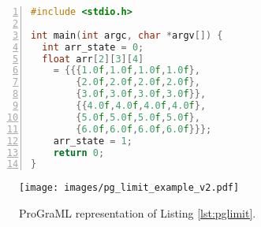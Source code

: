 \begin{minipage}{0.5\textwidth}
\begin{lstlisting}[language=C++,
                   numbers=left,
                   stepnumber=1,
                   numbersep=10pt,
                   showspaces=false,
                   basicstyle=\small,
                   showstringspaces=false,
                   captionpos=b,
                   xleftmargin=.04\textwidth, xrightmargin=.2\textwidth,
                   caption=C++ code example.,
                   label={lst:pglimit},]
#include <stdio.h>

int main(int argc, char *argv[]) {
  int arr_state = 0;
  float arr[2][3][4] 
    = {{{1.0f,1.0f,1.0f,1.0f}, 
        {2.0f,2.0f,2.0f,2.0f}, 
        {3.0f,3.0f,3.0f,3.0f}},
        {{4.0f,4.0f,4.0f,4.0f}, 
        {5.0f,5.0f,5.0f,5.0f}, 
        {6.0f,6.0f,6.0f,6.0f}}};
    arr_state = 1;
    return 0;
}
\end{lstlisting}
\vspace{-1.5cm}
\end{minipage}
\begin{minipage}{0.5\textwidth}
     \begin{figure}[H]
    \centering
     \texttt{[image: images/pg\_limit\_example\_v2.pdf]}
    \caption{ProGraML representation of Listing \ref{lst:pglimit}.}
    \label{figs:pglimit}
    \end{figure}
\end{minipage}